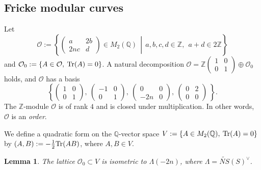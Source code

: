 \documentclass{article}
\theoremstyle{plain}
\newtheorem{lemma}[theorem]{Lemma}%
\theoremstyle{definition}
\theoremstyle{remark}
\newcommand{\Z}{{\mathbb Z}}
\newcommand{\Q}{{\mathbb Q}}
\begin{document}
\subsection{Fricke modular curves}\label{sec5.1}




Let 
\begin{equation*}\label{the order}
\mathcal{O} :=  
\left\{  \left. 
\begin{pmatrix}
  a       & 2b  \\ 
 2nc   & d   
\end{pmatrix} 
\in M_{2}({\Q}) 
\: \: \right|  \: \: 
a, b, c, d \in {\Z}, \: \: a+d \in 2{\Z}
\right\} 
\end{equation*}
and  
$
\mathcal{O}_{0} := \{  A\in \mathcal{O}, \: {\rm Tr\/}(A)=0 \}  
$. 
A natural decomposition 
$
\mathcal{O} = 
{\Z}
(
\begin{smallmatrix}
1 & 0 \\
0 & 1 
\end{smallmatrix}
)
\oplus 
\mathcal{O}_{0} 
$ 
holds, 
and $\mathcal{O}$ has a basis 
\begin{equation}\label{basis}
\left\{ 
\begin{pmatrix}
1 & 0 \\
0 & 1 
\end{pmatrix} , \: 
\begin{pmatrix}
-1 & 0 \\
0 & 1 
\end{pmatrix} , \: 
\begin{pmatrix}
0 & 0 \\
-2n & 0 
\end{pmatrix} , \: 
\begin{pmatrix}
0 & 2 \\
0 & 0 
\end{pmatrix} \: 
\right\} .
\end{equation} 
The ${\Z}$-module $\mathcal{O}$ 
is of rank $4$ 
and 
is closed under multiplication. 
In other words, 
$\mathcal{O}$ is an {\it order\/}. 





We define a quadratic form on 
the ${\Q}$-vector space 
$V :=  \{  A\in M_{2}({\Q}), \: {\rm Tr\/}(A)=0 \}$ 
by 
$(A, B) := -\frac{1}{2}{\rm Tr\/}(AB)$,  where $A, B \in V$.   





\begin{lemma}
The lattice $\mathcal{O}_{0} \subset V$ 
is isometric to 
$\Lambda (-2n)$, 
where 
$\Lambda = \widetilde{NS}(S)^{\vee}$. 
\end{lemma}
\end{document}
